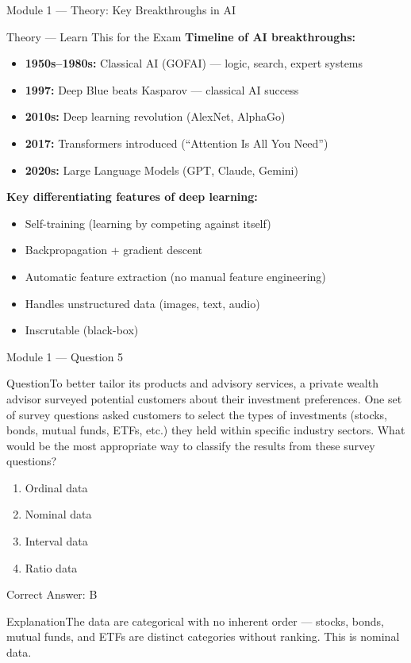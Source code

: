 \documentclass[aspectratio=169,10pt]{beamer}
\newcommand{\question}[1]{\begin{block}{Question}#1\end{block}}
\newcommand{\options}[4]{%
	\begin{enumerate}[label=\Alph*.,leftmargin=*]
		\item #1
		\item #2
		\item #3
		\item #4
	\end{enumerate}
}
\newcommand{\answerbox}[1]{\begin{exampleblock}{Correct Answer: #1}\end{exampleblock}}
\newcommand{\explain}[1]{\begin{block}{Explanation}#1\end{block}}
\newcommand{\theory}[1]{%
	\begin{block}{Theory --- Learn This for the Exam}
		\small #1
	\end{block}
}
\begin{document}
	\begin{frame}{Module 1 --- Theory: Key Breakthroughs in AI}
		\theory{
			\textbf{Timeline of AI breakthroughs:}
			\begin{itemize}
				\item \textbf{1950s--1980s:} Classical AI (GOFAI) --- logic, search, expert systems
				\item \textbf{1997:} Deep Blue beats Kasparov --- classical AI success
				\item \textbf{2010s:} Deep learning revolution (AlexNet, AlphaGo)
				\item \textbf{2017:} Transformers introduced (``Attention Is All You Need'')
				\item \textbf{2020s:} Large Language Models (GPT, Claude, Gemini)
			\end{itemize}
			\textbf{Key differentiating features of deep learning:}
			\begin{itemize}
				\item Self-training (learning by competing against itself)
				\item Backpropagation + gradient descent
				\item Automatic feature extraction (no manual feature engineering)
				\item Handles unstructured data (images, text, audio)
				\item Inscrutable (black-box)
			\end{itemize}
		}
	\end{frame}
	
	\begin{frame}{Module 1 --- Question 5}
		\question{To better tailor its products and advisory services, a private wealth advisor surveyed potential customers about their investment preferences. One set of survey questions asked customers to select the types of investments (stocks, bonds, mutual funds, ETFs, etc.) they held within specific industry sectors. What would be the most appropriate way to classify the results from these survey questions?}
		\options{Ordinal data}{Nominal data}{Interval data}{Ratio data}
		\answerbox{B}
		\explain{The data are categorical with no inherent order --- stocks, bonds, mutual funds, and ETFs are distinct categories without ranking. This is nominal data.}
	\end{frame}
	
\end{document}
